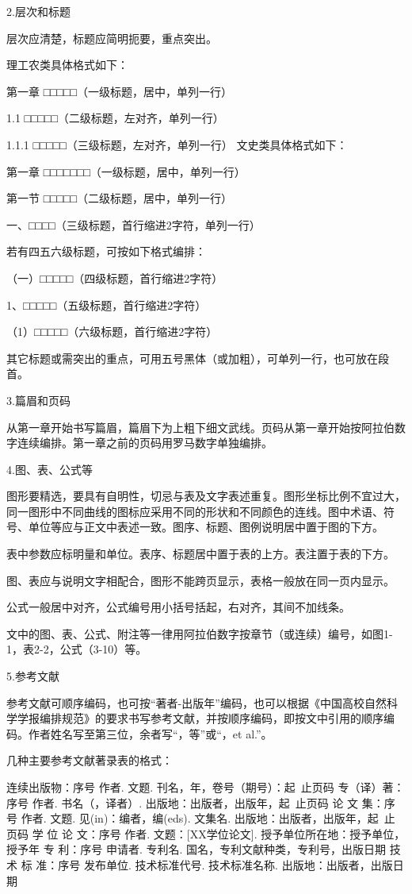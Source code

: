2.层次和标题

层次应清楚，标题应简明扼要，重点突出。

理工农类具体格式如下：

第一章   □□□□□（一级标题，居中，单列一行）

1.1   □□□□□（二级标题，左对齐，单列一行）

1.1.1   □□□□□（三级标题，左对齐，单列一行）
\newline
文史类具体格式如下：

第一章   □□□□□□□（一级标题，居中，单列一行）

第一节   □□□□□（二级标题，居中，单列一行）

一、□□□□（三级标题，首行缩进2字符，单列一行）

若有四五六级标题，可按如下格式编排：

（一）□□□□□（四级标题，首行缩进2字符）

1、□□□□□（五级标题，首行缩进2字符）

（1）□□□□□（六级标题，首行缩进2字符）

其它标题或需突出的重点，可用五号黑体（或加粗），可单列一行，也可放在段首。

3.篇眉和页码

从第一章开始书写篇眉，篇眉下为上粗下细文武线。页码从第一章开始按阿拉伯数字连续编排。第一章之前的页码用罗马数字单独编排。

4.图、表、公式等

图形要精选，要具有自明性，切忌与表及文字表述重复。图形坐标比例不宜过大，同一图形中不同曲线的图标应采用不同的形状和不同颜色的连线。图中术语、符号、单位等应与正文中表述一致。图序、标题、图例说明居中置于图的下方。

表中参数应标明量和单位。表序、标题居中置于表的上方。表注置于表的下方。\cite{zhangkun1994}

图、表应与说明文字相配合，图形不能跨页显示，表格一般放在同一页内显示。

公式一般居中对齐，公式编号用小括号括起，右对齐，其间不加线条。

文中的图、表、公式、附注等一律用阿拉伯数字按章节（或连续）编号，如图1-1，表2-2，公式（3-10）等。

5.参考文献

参考文献可顺序编码，也可按“著者-出版年”编码，也可以根据《中国高校自然科学学报编排规范》的要求书写参考文献，并按顺序编码，即按文中引用的顺序编码。作者姓名写至第三位，余者写“，等”或“，et al.”。

几种主要参考文献著录表的格式：

连续出版物：序号 作者. 文题. 刊名，年，卷号（期号）：起~止页码
专（译）著：序号 作者. 书名（，译者）. 出版地：出版者，出版年，起~止页码
论  文  集：序号 作者. 文题. 见(in)：编者，编(eds). 文集名. 出版地：出版者，出版年，起~止页码
学 位 论 文：序号 作者. 文题：[XX学位论文]. 授予单位所在地：授予单位，授予年
专       利：序号 申请者. 专利名. 国名，专利文献种类，专利号，出版日期
技 术 标 准：序号 发布单位. 技术标准代号. 技术标准名称. 出版地：出版者，出版日期

